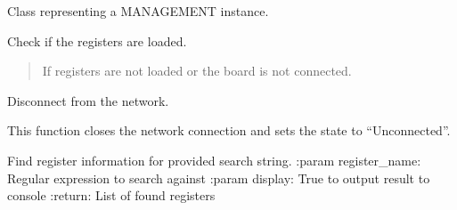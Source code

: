 \documentclass[letterpaper,10pt,english]{sphinxmanual}
\begin{document}
\begin{fulllineitems}

\pysigstartsignatures
{}
\pysigstopsignatures
\sphinxAtStartPar
Class representing a MANAGEMENT instance.


\begin{fulllineitems}

\pysigstartsignatures
{}
\pysigstopsignatures
\sphinxAtStartPar
Check if the registers are loaded.
\begin{quote}\begin{description}
\sphinxAtStartPar
{} \textendash{} If registers are not loaded or the board is not connected.

\end{description}\end{quote}

\end{fulllineitems}



\begin{fulllineitems}

\pysigstartsignatures
{}
\pysigstopsignatures
\sphinxAtStartPar
Disconnect from the network.

\sphinxAtStartPar
This function closes the network connection and sets the state to “Unconnected”.
\begin{quote}\begin{description}
\sphinxAtStartPar
{} \textendash{} 

\end{description}\end{quote}

\end{fulllineitems}



\begin{fulllineitems}

\pysigstartsignatures
{}
\pysigstopsignatures
\sphinxAtStartPar
Find register information for provided search string.
:param register\_name: Regular expression to search against
:param display: True to output result to console
:return: List of found registers


\end{fulllineitems}
\end{fulllineitems}
\end{document}
